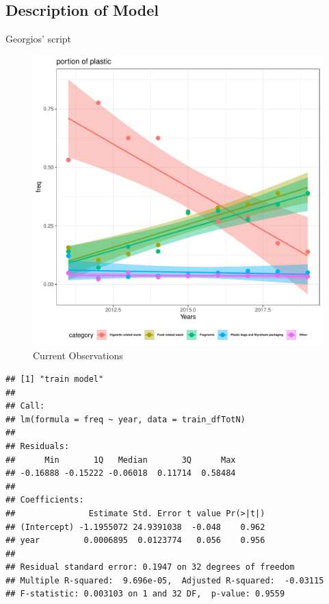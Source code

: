 \documentclass[10pt]{article}\usepackage[]{graphicx}\usepackage[]{color}
\makeatletter
\def\maxwidth{ %
  \ifdim\Gin@nat@width>\linewidth
    \linewidth
  \else
    \Gin@nat@width
  \fi
}
\newenvironment{kframe}{%
 \def\at@end@of@kframe{}%
 \ifinner\ifhmode%
  \def\at@end@of@kframe{\end{minipage}}%
  \begin{minipage}{\columnwidth}%
 \fi\fi%
 \def\FrameCommand##1{\hskip\@totalleftmargin \hskip-\fboxsep
 \colorbox{shadecolor}{##1}\hskip-\fboxsep
     \hskip-\linewidth \hskip-\@totalleftmargin \hskip\columnwidth}%
 \MakeFramed {\advance\hsize-\width
   \@totalleftmargin\z@ \linewidth\hsize
   \@setminipage}}%
 {\par\unskip\endMakeFramed%
 \at@end@of@kframe}
\newenvironment{knitrout}{}{} %
\makeatother
\begin{document}
\subsection{Description of Model}

Georgios' script


\begin{figure}[H] %
\begin{center}
\begin{knitrout}
\color{fgcolor}\begin{kframe}


{\ttfamily\noindent\itshape{}}\end{kframe}
\includegraphics[width=\maxwidth]{figure/unnamed-chunk-18-1} 

\end{knitrout}
\caption {Current Observations}
\label{figH}
\end {center}
\end {figure}

\begin{knitrout}
\color{fgcolor}\begin{kframe}
\begin{verbatim}
## [1] "train model"
## 
## Call:
## lm(formula = freq ~ year, data = train_dfTotN)
## 
## Residuals:
##      Min       1Q   Median       3Q      Max 
## -0.16888 -0.15222 -0.06018  0.11714  0.58484 
## 
## Coefficients:
##               Estimate Std. Error t value Pr(>|t|)
## (Intercept) -1.1955072 24.9391038  -0.048    0.962
## year         0.0006895  0.0123774   0.056    0.956
## 
## Residual standard error: 0.1947 on 32 degrees of freedom
## Multiple R-squared:  9.696e-05,	Adjusted R-squared:  -0.03115 
## F-statistic: 0.003103 on 1 and 32 DF,  p-value: 0.9559
\end{verbatim}
\end{kframe}
\end{knitrout}
\end{document}
